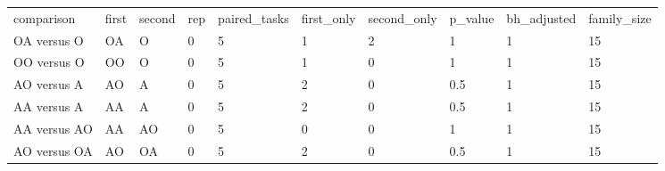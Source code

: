 \begin{tabular}{llllllllll}
comparison & first & second & rep & paired\_tasks & first\_only & second\_only & p\_value & bh\_adjusted & family\_size \\
OA versus O & OA & O & 0 & 5 & 1 & 2 & 1 & 1 & 15 \\
OO versus O & OO & O & 0 & 5 & 1 & 0 & 1 & 1 & 15 \\
AO versus A & AO & A & 0 & 5 & 2 & 0 & 0.5 & 1 & 15 \\
AA versus A & AA & A & 0 & 5 & 2 & 0 & 0.5 & 1 & 15 \\
AA versus AO & AA & AO & 0 & 5 & 0 & 0 & 1 & 1 & 15 \\
AO versus OA & AO & OA & 0 & 5 & 2 & 0 & 0.5 & 1 & 15 \\
\end{tabular}
